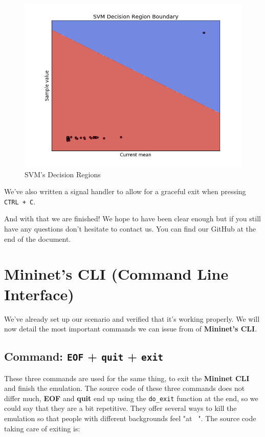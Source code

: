 \documentclass[12pt]{report}
\newcommand{\newpar} {
    \vskip 1cm
}
\begin{document}
				\begin{figure}
					\centering
					\includegraphics[scale = 1]{svm_graph.png}
					\caption{SVM's Decision Regions}
					\label{f:svm_graph}
				\end{figure}

				We've also written a signal handler to allow for a graceful exit when pressing \texttt{CTRL + C}.
				\newpar
				And with that we are finished!   We hope to have been clear enough but if you still have any questions don't hesitate to contact us. You can find our GitHub at the end of the document.

	\section{Mininet's CLI (\textbf{C}ommand \textbf{L}ine \textbf{I}nterface)}
		We've already set up our scenario and verified that it's working properly. We will now detail the most important commands we can issue from of \textbf{Mininet's CLI}.

		\subsection{Command: \texttt{EOF} + \texttt{quit} + \texttt{exit}}
			These three commands are used for the same thing, to exit the \textbf{Mininet CLI} and finish the emulation. The source code of these three commands does not differ much, \textbf{EOF} and \textbf{quit} end up using the \texttt{do\_exit} function at the end, so we could say that they are a bit repetitive. They offer several ways to kill the emulation so that people with different backgrounds feel "at \texttt{~}". The source code taking care of exiting is:
\end{document}
